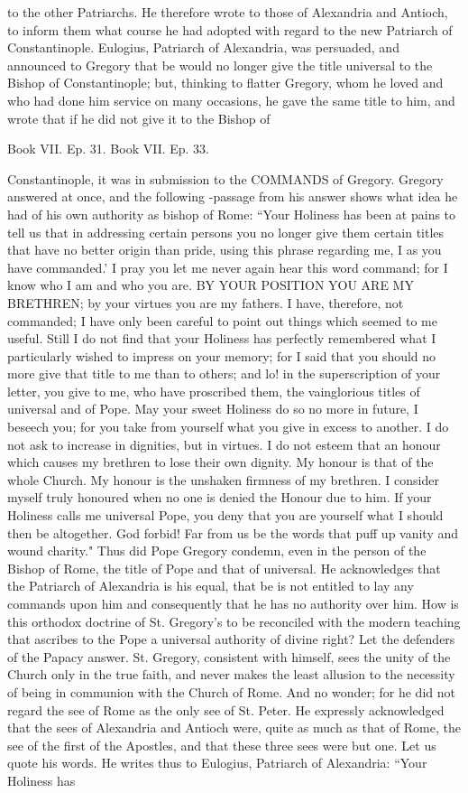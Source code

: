 to the other Patriarchs. He therefore wrote to those of Alexandria and Antioch, to inform them what course he had adopted with regard to the new Patriarch of Constantinople. Eulogius, Patriarch of Alexandria, was persuaded, and announced to Gregory that be would no longer give the title universal to the Bishop of Constantinople; but, thinking to flatter Gregory, whom he loved and who had done him service on many occasions, he gave the same title to him, and wrote that if he did not give it to the Bishop of

Book VII. Ep. 31. Book VII. Ep. 33.

Constantinople, it was in submission to the COMMANDS of Gregory. Gregory answered at once, and the following -passage from his answer shows what idea he had of his own authority as bishop of Rome: “Your Holiness has been at pains to tell us that in addressing certain persons you no longer give them certain titles that have no better origin than pride, using this phrase regarding me, I as you have commanded.’ I pray you let me never again hear this word command; for I know who I am and who you are. BY YOUR POSITION YOU ARE MY BRETHREN; by your virtues you are my fathers. I have, therefore, not commanded; I have only been careful to point out things which seemed to me useful. Still I do not find that your Holiness has perfectly remembered what I particularly wished to impress on your memory; for I said that you should no more give that title to me than to others; and lo! in the superscription of your letter, you give to me, who have proscribed them, the vainglorious titles of universal and of Pope. May your sweet Holiness do so no more in future, I beseech you; for you take from yourself what you give in excess to another. I do not ask to increase in dignities, but in virtues. I do not esteem that an honour which causes my brethren to lose their own dignity. My honour is that of the whole Church. My honour is the unshaken firmness of my brethren. I consider myself truly honoured when no one is denied the Honour due to him. If your Holiness calls me universal Pope, you deny that you are yourself what I should then be altogether. God forbid! Far from us be the words that puff up vanity and wound charity." Thus did Pope Gregory condemn, even in the person of the Bishop of Rome, the title of Pope and that of universal. He acknowledges that the Patriarch of Alexandria is his equal, that be is not entitled to lay any commands upon him and consequently that he has no authority over him. How is this orthodox doctrine of St. Gregory's to be reconciled with the modern teaching that ascribes to the Pope a universal authority of divine right? Let the defenders of the Papacy answer. St. Gregory, consistent with himself, sees the unity of the Church only in the true faith, and never makes the least allusion to the necessity of being in communion with the Church of Rome. And no wonder; for he did not regard the see of Rome as the only see of St. Peter. He expressly acknowledged that the sees of Alexandria and Antioch were, quite as much as that of Rome, the see of the first of the Apostles, and that these three sees were but one. Let us quote his words. He writes thus to Eulogius, Patriarch of Alexandria: “Your Holiness has 